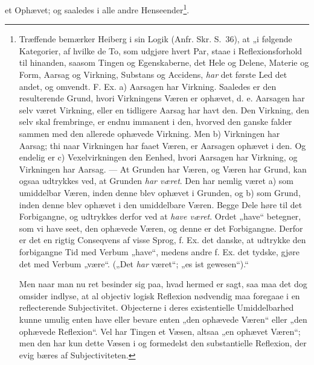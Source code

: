 \documentclass[11pt]{book}
\begin{document}
et Ophævet; og saaledes i alle andre Henseender\footnote{Træffende bemærker
Heiberg i sin Logik (Anfr. Skr. S.\ 36), at „i følgende Kategorier, af hvilke
de To, som udgjøre hvert Par, staae i Reflexionsforhold til hinanden, saasom
Tingen og Egenskaberne, det Hele og Delene, Materie og Form, Aarsag og
Virkning, Substans og Accidens, \emph{har} det første Led det andet, og
omvendt. F. Ex. a) Aarsagen har Virkning. Saaledes er den resulterende Grund,
hvori Virkningens Væren er ophævet, d. e. Aarsagen har selv været Virkning,
eller en tidligere Aarsag har havt den. Den Virkning, den selv skal
frembringe, er endnu immanent i den, hvorved den ganske falder sammen med den
allerede ophævede Virkning. Men b) Virkningen har Aarsag; thi naar Virkningen
har faaet Væren, er Aarsagen ophævet i den. Og endelig er c) Vexelvirkningen
den Eenhed, hvori Aarsagen har Virkning, og Virkningen har Aarsag. --- At
Grunden har Væren, og Væren har Grund, kan ogsaa udtrykkes ved, at Grunden
\emph{har været}. Den har nemlig været a) som umiddelbar Væren, inden denne
blev ophævet i Grunden, og b) som Grund, inden denne
blev ophævet i den umiddelbare Væren. Begge Dele høre til det Forbigangne, og
udtrykkes derfor ved at \emph{have været}. Ordet „have“ betegner, som vi have
seet, den ophævede Væren, og denne er det Forbigangne. Derfor er det en rigtig
Conseqvens af visse Sprog, f. Ex. det danske, at udtrykke den forbigangne Tid
med Verbum „have“, medens andre f. Ex. det tydske, gjøre det med Verbum
„være“. („Det \emph{har} været“; „es ist gewesen“).“

Men naar man nu ret besinder sig paa, hvad hermed er sagt, saa maa det dog
omsider indlyse, at al objectiv logisk Reflexion nødvendig maa foregaae i en
reflecterende Subjectivitet. Objecterne i deres existentielle Umiddelbarhed
kunne umulig enten have eller bevare enten „den ophævede Væren“ eller „den
ophævede Reflexion“. Vel har Tingen et Væsen, altsaa „en ophævet Væren“; men
den har kun dette Væsen i og formedelst den substantielle Reflexion, der evig
bæres af Subjectiviteten.}.
\end{document}
